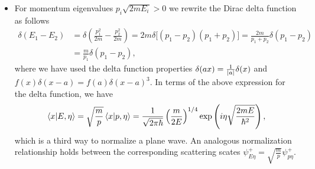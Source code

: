 \documentclass[11pt, a4paper]{article}
\begin{document}
\begin{itemize}
    \item For momentum eigenvalues $ p_{i} \sqrt{2mE_{i}} > 0 $ we rewrite the Dirac delta function as follows
    \begin{align*}
        \delta(E_{1} - E_{2}) &= \delta \left( \frac{p_{1}^{2}}{2m} - \frac{p_{2}^{2}}{2m} \right) = 2m \delta \big[ (p_{1} - p_{2})(p_{1} + p_{2}) \big] = \frac{2m}{p_{1} + p_{2}}\delta(p_{1} - p_{2})\\
        & = \frac{m}{p_{1}} \delta(p_{1} - p_{2}),
    \end{align*}
    where we have used the delta function properties $ \delta(ax) = \frac{1}{\abs{a}}\delta(x) $ and $ f(x)\delta(x-a) = f(a)\delta(x-a)^{3} $. In terms of the above expression for the delta function, we have
    \begin{equation*}
        \braket{x}{E, \eta} = \sqrt{\frac{m}{p}} \braket{x}{p, \eta} = \frac{1}{\sqrt{2\pi \hbar}} \left( \frac{m}{2E} \right)^{1/4} \exp \left( i\eta \sqrt{\frac{2m E}{\hbar^{2}}} \right),
    \end{equation*}
    which is a third way to normalize a plane wave. An analogous normalization relationship holds between the corresponding scattering scates $ \psi_{E\eta}^{+} = \sqrt{\frac{m}{p}} \psi_{p\eta}^{+} $.

\end{itemize}
\end{document}
